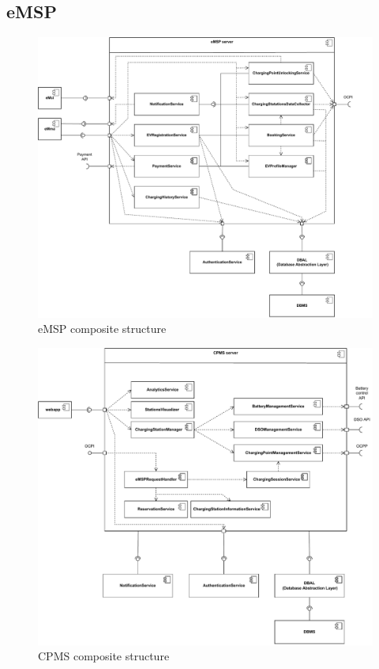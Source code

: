 \subsection{eMSP}
\begin{figure}[H]
    \centering
    \includegraphics[width=1\textwidth]{Images/cp2/eMSP_server.pdf}
    \caption{eMSP composite structure}
\end{figure}

\begin{figure}[H]
    \centering
    \includegraphics[width=1\textwidth]{Images/cp2/CPMS_server.pdf}
    \caption{CPMS composite structure}
\end{figure}

